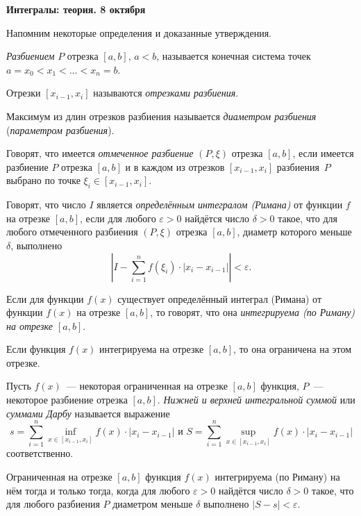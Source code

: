 \centerline{{\bf Интегралы: теория. 8 октября}}
\medskip

Напомним некоторые определения и доказанные утверждения. 

\begin{definition}
{\it Разбиением} $P$ отрезка $[a,b]$, $a<b$, называется конечная система точек
$a=x_0<x_1<\ldots<x_n=b$. 

Отрезки $[x_{i-1},x_i]$ называются {\it отрезками разбиения}.

Максимум из длин отрезков разбиения называется {\it диаметром разбиения} ({\it параметром разбиения}).
\end{definition}

\begin{definition}
Говорят, что имеется {\it отмеченное разбиение} $(P,\xi)$ отрезка $[a,b]$,
если имеется разбиение $P$ отрезка $[a,b]$ и в каждом из отрезков $[x_{i-1},x_i]$ разбиения~$P$
выбрано по точке $\xi_i\in [x_{i-1},x_i]$.
\end{definition}

\begin{definition}
Говорят, что число $I$ является {\it определённым интегралом (Римана)} от функции $f$
на отрезке $[a,b]$, если для любого $\varepsilon>0$ найдётся число $\delta>0$ такое,
что для любого отмеченного разбиения $(P,\xi)$ отрезка $[a,b]$, диаметр которого меньше $\delta$,
выполнено
\[
\left|I-\sum_{i=1}^nf(\xi_i)\cdot |x_i-x_{i-1}|\right|<\varepsilon.
\]

Если для функции $f(x)$ существует определённый интеграл (Римана) от функции $f(x)$ на отрезке $[a,b]$,
то говорят, что она {\it интегрируема (по Риману) на отрезке $[a,b]$}.
\end{definition}

\begin{statement}
Если функция $f(x)$ интегрируема на отрезке $[a,b]$, то она ограничена на этом отрезке.
\end{statement}

\begin{definition}
Пусть $f(x)$~--- некоторая ограниченная на отрезке $[a,b]$ функция,
$P$~--- некоторое разбиение отрезка $[a,b]$. {\it Нижней и верхней интегральной суммой}
или {\it суммами Дарбу} называется выражение
\[
s=\sum_{i=1}^n \inf_{x\in [x_{i-1},x_i]} f(x)\cdot |x_i-x_{i-1}|\text{ и }
S=\sum_{i=1}^n \sup_{x\in [x_{i-1},x_i]} f(x)\cdot |x_i-x_{i-1}|
\]
соответственно.
\end{definition}

\begin{theorem}
Ограниченная на отрезке $[a,b]$ функция $f(x)$ интегрируема (по Риману) на нём тогда и только тогда,
когда для любого $\varepsilon>0$ найдётся число $\delta>0$ такое, что для любого разбиения $P$
диаметром меньше $\delta$ выполнено $|S-s|<\varepsilon$.
\end{theorem}




